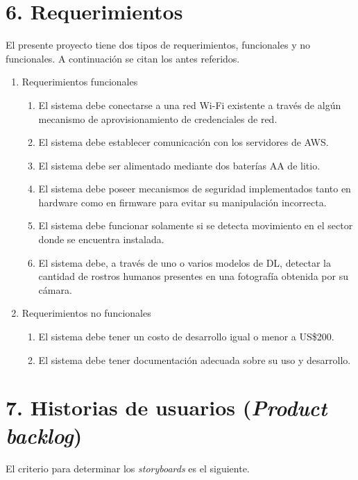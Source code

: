 \documentclass[
11pt, %
]{plan}
\begin{document}
\section{6. Requerimientos}
\label{sec:requerimientos}

El presente proyecto tiene dos tipos de requerimientos, funcionales y no funcionales. A continuación se citan los antes referidos.

\begin{enumerate}
	\item Requerimientos funcionales
		\begin{enumerate}
			\item El sistema debe conectarse a una red Wi-Fi existente a través de algún mecanismo de aprovisionamiento de credenciales de red.
			\item El sistema debe establecer comunicación con los servidores de AWS.
			\item El sistema debe ser alimentado mediante dos baterías AA de litio.
			\item El sistema debe poseer mecanismos de seguridad implementados tanto en hardware como en firmware para evitar su manipulación incorrecta.
			\item El sistema debe funcionar solamente si se detecta movimiento en el sector donde se encuentra instalada.
			\item El sistema debe, a través de uno o varios modelos de DL, detectar la cantidad de rostros humanos presentes en una fotografía obtenida por su cámara.
		\end{enumerate}
	\item Requerimientos no funcionales
		\begin{enumerate}
			\item El sistema debe tener un costo de desarrollo igual o menor a US\$200.
			\item El sistema debe tener documentación adecuada sobre su uso y desarrollo.
		\end{enumerate}
\end{enumerate}

\section{7. Historias de usuarios (\textit{Product backlog})}
\label{sec:backlog}

El criterio para determinar los \textit{storyboards} es el siguiente.
\end{document}
